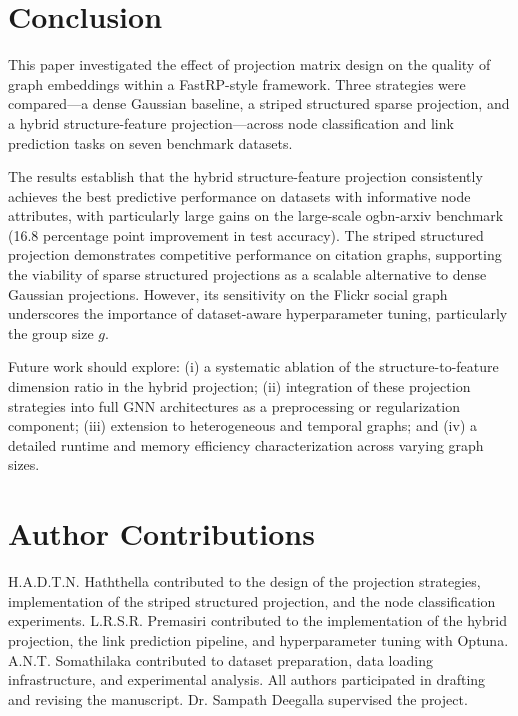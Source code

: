 \documentclass[conference]{IEEEtran}
\begin{document}
\section{Conclusion}
\label{sec:conclusion}

This paper investigated the effect of projection matrix design on the
quality of graph embeddings within a FastRP-style framework. Three
strategies were compared---a dense Gaussian baseline, a striped structured
sparse projection, and a hybrid structure-feature projection---across node
classification and link prediction tasks on seven benchmark datasets.

The results establish that the hybrid structure-feature projection
consistently achieves the best predictive performance on datasets with
informative node attributes, with particularly large gains on the
large-scale ogbn-arxiv benchmark (16.8 percentage point improvement in
test accuracy). The striped structured projection demonstrates competitive
performance on citation graphs, supporting the viability of sparse
structured projections as a scalable alternative to dense Gaussian
projections. However, its sensitivity on the Flickr social graph
underscores the importance of dataset-aware hyperparameter tuning,
particularly the group size $g$.

Future work should explore: (i) a systematic ablation of the
structure-to-feature dimension ratio in the hybrid projection; (ii)
integration of these projection strategies into full GNN architectures as
a preprocessing or regularization component; (iii) extension to
heterogeneous and temporal graphs; and (iv) a detailed runtime and memory
efficiency characterization across varying graph sizes.

\section*{Author Contributions}

H.A.D.T.N. Haththella contributed to the design of the projection
strategies, implementation of the striped structured projection, and the
node classification experiments.
L.R.S.R. Premasiri contributed to the implementation of the hybrid
projection, the link prediction pipeline, and hyperparameter tuning with
Optuna.
A.N.T. Somathilaka contributed to dataset preparation, data loading
infrastructure, and experimental analysis.
All authors participated in drafting and revising the manuscript.
Dr. Sampath Deegalla supervised the project.




\end{document}

